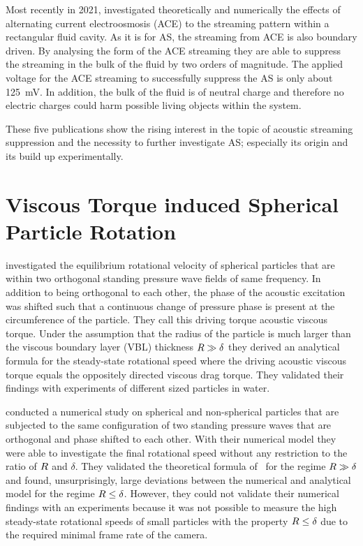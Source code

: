 Most recently in 2021,  investigated theoretically and 
numerically the effects of alternating current electroosmosis (ACE) to the 
streaming pattern within a rectangular fluid cavity. As it is for AS, the 
streaming from ACE is also boundary driven. By analysing the form of the ACE 
streaming they are able to suppress the streaming in the bulk of the fluid by 
two orders of magnitude. The applied voltage for the ACE streaming to 
successfully suppress the AS is only about \SI{125}{\milli\volt}. In addition, 
the bulk of the fluid is of neutral charge and therefore no electric charges 
could harm possible living objects within the system.

These five publications show the rising interest in the topic of acoustic 
streaming suppression and the necessity to further investigate AS; especially 
its origin and its build up experimentally.

\section{Viscous Torque induced Spherical Particle Rotation}

 investigated the equilibrium rotational velocity of 
spherical particles that are within two orthogonal standing pressure wave 
fields of same frequency. In addition to being orthogonal to each other, the 
phase of the acoustic excitation was shifted such that a continuous change of 
pressure phase is present at the circumference of the particle. They call this 
driving torque acoustic viscous torque. Under the assumption that the radius of 
the particle is much larger than the viscous boundary layer (VBL) thickness 
$R\gg\delta$ they derived an analytical formula for the steady-state 
rotational speed where the driving acoustic viscous torque equals the 
oppositely directed viscous drag torque. They validated their findings with 
experiments of different sized particles in water.

 conducted a numerical study on spherical and non-spherical 
particles that are subjected to the same configuration of two standing pressure 
waves that are orthogonal and phase shifted to each other. With their numerical 
model they were able to investigate the final rotational speed without any 
restriction to the ratio of $R$ and $\delta$. They validated the theoretical 
formula of~\cite{Lamprecht2015} for the regime $R\gg\delta$ and found, 
unsurprisingly, large deviations between the numerical and analytical model for 
the regime $R\leq\delta$. However, they could not validate their numerical 
findings with an experiments because it was not possible to measure the high 
steady-state rotational speeds of small particles with the property 
$R\leq\delta$ due to the required minimal frame rate of the camera.

